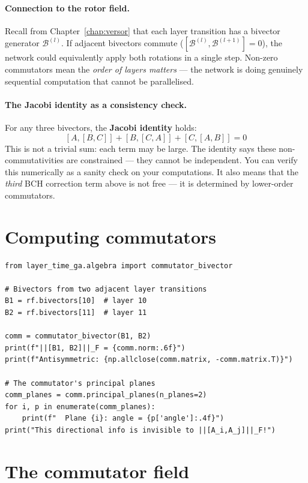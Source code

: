 \documentclass[11pt, twoside, openright]{memoir}
\newcommand{\bivec}[1]{\mathcal{B}^{(#1)}}  %
\begin{document}
\paragraph{Connection to the rotor field.}
Recall from Chapter~\ref{chap:versor} that each layer transition has
a bivector generator $\bivec{l}$.  If adjacent bivectors commute
($[\bivec{l}, \bivec{l+1}] = 0$), the network could equivalently apply
both rotations in a single step.  Non-zero commutators mean the
\emph{order of layers matters} --- the network is doing genuinely
sequential computation that cannot be parallelised.

\paragraph{The Jacobi identity as a consistency check.}
For any three bivectors, the \textbf{Jacobi identity} holds:
\[
  [A, [B, C]] + [B, [C, A]] + [C, [A, B]] = 0
\]
This is not a trivial sum: each term may be large.  The identity says
these non-commutativities are constrained --- they cannot be
independent.  You can verify this numerically as a sanity check on
your computations.  It also means that the \emph{third} BCH correction
term above is not free --- it is determined by lower-order commutators.

\section{Computing commutators}

\begin{lstlisting}[caption={Commutator of two bivectors}]
from layer_time_ga.algebra import commutator_bivector

# Bivectors from two adjacent layer transitions
B1 = rf.bivectors[10]  # layer 10
B2 = rf.bivectors[11]  # layer 11

comm = commutator_bivector(B1, B2)
print(f"||[B1, B2]||_F = {comm.norm:.6f}")
print(f"Antisymmetric: {np.allclose(comm.matrix, -comm.matrix.T)}")

# The commutator's principal planes
comm_planes = comm.principal_planes(n_planes=2)
for i, p in enumerate(comm_planes):
    print(f"  Plane {i}: angle = {p['angle']:.4f}")
print("This directional info is invisible to ||[A_i,A_j]||_F!")
\end{lstlisting}

\section{The commutator field}
\end{document}

